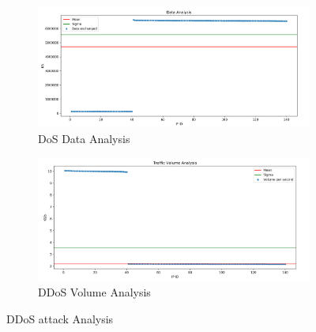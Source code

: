 \begin{figure}[h]
	\begin{subfigure}{0.48\textwidth}
		\includegraphics[width=\textwidth]{imgs/ddos_atk-data_analysis.png}
		\caption{DoS Data Analysis} 
		\label{fig:ddos_data}
	\end{subfigure}
	\hspace*{\fill} %
	\begin{subfigure}{0.48\textwidth}
		\includegraphics[width=\textwidth]{imgs/ddos_atk-volume_analysis.png}
		\caption{DDoS Volume Analysis} 
		\label{fig:ddos_volume}
	\end{subfigure}
	\caption{DDoS attack Analysis}
	\label{fig:ddos_analysis}
\end{figure}






